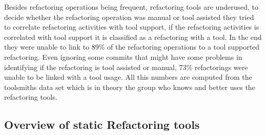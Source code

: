 Besides refactoring operations being frequent, refactoring tools are underused, to decide whether the refactoring operation was manual or tool assisted they tried to correlate refactoring activities with tool support, if the refactoring activities is correlated with tool support it is classified as a refactoring with a tool. In the end they were unable to link to 89\% of the refactoring operations to a tool supported refactoring. Even ignoring some commits that might have some problems in identifying if the refactoring is tool assisted or manual, 73\% refactorings were unable to be linked with a tool usage.
All this numbers are computed from the toolsmiths data set which is in theory the group who knows and better uses the refactoring tools.


\subsection{Overview of static Refactoring tools}

